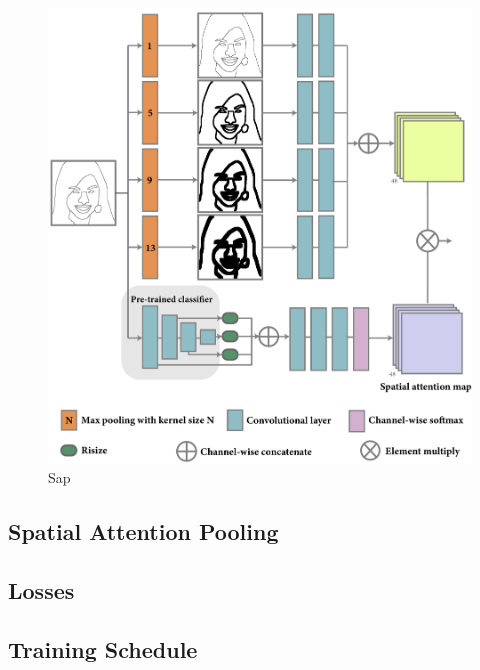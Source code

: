 \begin{figure}
	\includegraphics[width=\columnwidth]{figs/sap}
	\caption{Sap}
	\label{fig:sap}
\end{figure}


\subsection{Spatial Attention Pooling}
\label{subsec:algorithm_sap}




\subsection{Losses}
\label{subsec:algorithm_loss}
%

\subsection{Training Schedule}
\label{subsec:algorithm_training}

